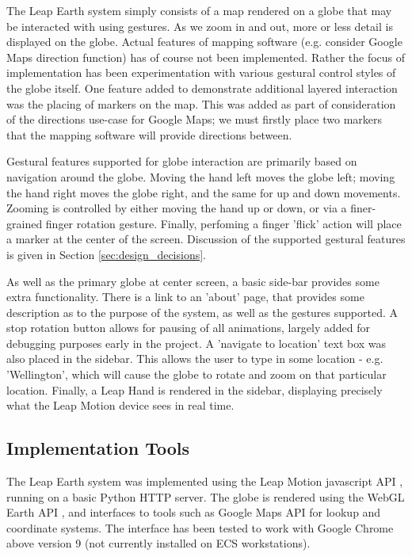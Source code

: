 \documentclass{sigplanconf}
\begin{document}
The Leap Earth system simply consists of a map rendered on a globe that may be interacted with using gestures. As we zoom in and out, more or less detail is displayed on the globe. Actual features of mapping software (e.g. consider Google Maps direction function) has of course not been implemented. Rather the focus of implementation has been experimentation with various gestural control styles of the globe itself. One feature added to demonstrate additional layered interaction was the placing of markers on the map. This was added as part of consideration of the directions use-case for Google Maps; we must firstly place two markers that the mapping software will provide directions between. 

Gestural features supported for globe interaction are primarily based on navigation around the globe. Moving the hand left moves the globe left; moving the hand right moves the globe right, and the same for up and down movements. Zooming is controlled by either moving the hand up or down, or via a finer-grained finger rotation gesture. Finally, perfoming a finger 'flick' action will place a marker at the center of the screen. Discussion of the supported gestural features is given in Section \ref{sec:design_decisions}.

As well as the primary globe at center screen, a basic side-bar provides some extra functionality. There is a link to an 'about' page, that provides some description as to the purpose of the system, as well as the gestures supported. A stop rotation button allows for pausing of all animations, largely added for debugging purposes early in the project. A 'navigate to location' text box was also placed in the sidebar. This allows the user to type in some location - e.g. 'Wellington', which will cause the globe to rotate and zoom on that particular location. Finally, a Leap Hand is rendered in the sidebar, displaying precisely what the Leap Motion device sees in real time. 

\subsection{Implementation Tools}

The Leap Earth system was implemented using the Leap Motion javascript API \cite{}, running on a basic Python HTTP server. The globe is rendered using the WebGL Earth API \cite{}, and interfaces to tools such as Google Maps API for lookup and coordinate systems. The interface has been tested to work with Google Chrome above version 9 (not currently installed on ECS workstations).
\end{document}

